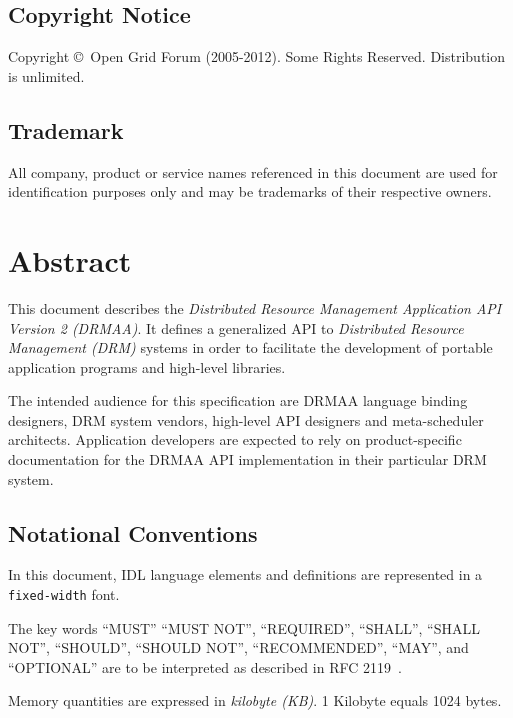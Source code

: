 \documentclass{article}
\newcommand{\copyrightyears}{2005-2012}
\newcommand{\h}[1]{\lstinline|#1|}
\begin{document}
\subsection*{Copyright Notice}

Copyright \copyright \ Open Grid Forum (\copyrightyears).  Some Rights Reserved.  
Distribution is unlimited.

\subsection*{Trademark}

All company, product or service names referenced in this document are used for identification purposes only and may be trademarks of their respective owners. 

\section*{Abstract}

This document describes the \emph{Distributed Resource Management Application API Version 2 (DRMAA)}. It defines a generalized API to \emph{Distributed Resource Management (DRM)} systems in order to facilitate the development of portable application programs and high-level libraries. 

The intended audience for this specification are DRMAA language binding designers, DRM system vendors, high-level API designers and meta-scheduler architects. Application developers are expected to rely on product-specific documentation for the DRMAA API implementation in their particular DRM system.

\newpage

\subsection*{Notational Conventions}
\label{sec:rfc2119}

In this document, IDL language elements and definitions are represented in a \h{fixed-width} font. 

The key words \enquote{MUST} \enquote{MUST NOT}, \enquote{REQUIRED}, \enquote{SHALL}, \enquote{SHALL NOT}, \enquote{SHOULD}, \enquote{SHOULD NOT}, \enquote{RECOMMENDED}, \enquote{MAY},  and \enquote{OPTIONAL} are to be interpreted as described in RFC 2119~\cite{rfc2119}. 

Memory quantities are expressed in \emph{kilobyte (KB)}. 1 Kilobyte equals 1024 bytes. 
\end{document}
